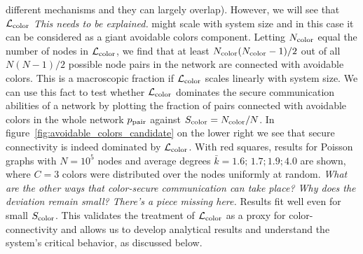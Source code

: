 \documentclass[aps, pre, twocolumn, a4paper, superscriptaddress, floatfix]{revtex4}
\newcommand{\red}{\color{red}\footnotesize}
\begin{document}
different mechanisms and they can largely overlap). 
However, we will see that $\mathcal{L}_{\rm color}$ {\red \textit{This needs to be explained.} might} scale with system size 
and in this case it can be considered as a giant avoidable colors component. 
Letting $N_{\rm color}$ equal the number of nodes in $\mathcal{L}_{\rm color}$,
we find that at least $N_{\rm color}(N_{\rm color}-1)/2$ out of all $N(N-1)/2$ 
possible node pairs in the network are connected with avoidable colors. 
This is a macroscopic fraction if $\mathcal{L}_{\rm color}$ scales linearly with system size. 
{\red We can use this fact to test whether $\mathcal{L}_{\rm color}$ dominates the secure communication abilities 
of a network by plotting the fraction of pairs connected with avoidable colors in the 
whole network $p_{\rm pair}$ against $S_{\rm color}=N_{\rm color}/N$. 
In figure~\ref{fig:avoidable_colors_candidate} on the lower right we see that secure 
connectivity is indeed dominated by $\mathcal{L}_{\rm color}$. 
With red squares, results for Poisson graphs with $N=10^5$ nodes and average degrees 
${\bar k}=1.6;\,1.7;1.9;4.0$ are shown, where $C=3$ colors were distributed over the nodes 
uniformly at random. 
\textit{What are the other ways that color-secure communication can take place? Why does the deviation remain small? There's a piece missing here.}}
Results fit well even for small $S_{\rm color}$. 
This validates the treatment of $\mathcal{L}_{\rm color}$ as a proxy for color-connectivity and allows us to develop analytical results and understand the system's critical behavior, as discussed below. 
\end{document}
